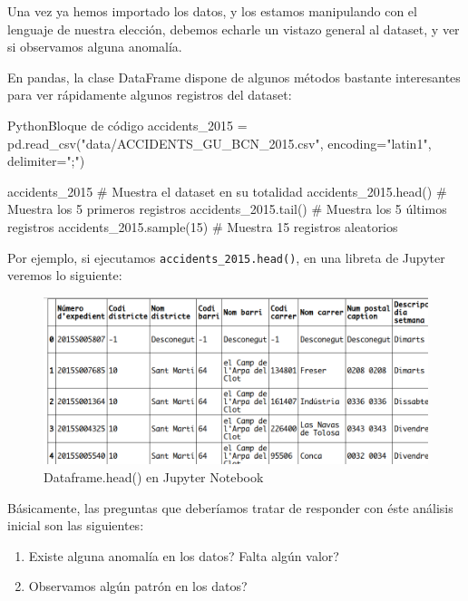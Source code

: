Una vez ya hemos importado los datos, y los estamos manipulando con el lenguaje
de nuestra elección, debemos echarle un vistazo general al dataset, y ver si
observamos alguna anomalía.

En pandas, la clase DataFrame dispone de algunos métodos bastante interesantes
para ver rápidamente algunos registros del dataset: 

\vspace{0.5cm}

\begin{TMcode}{Python}{}{Bloque de código}
accidents_2015 = pd.read_csv("data/ACCIDENTS_GU_BCN_2015.csv", encoding="latin1", delimiter=";")

accidents_2015            # Muestra el dataset en su totalidad
accidents_2015.head()     # Muestra los 5 primeros registros
accidents_2015.tail()     # Muestra los 5 últimos registros
accidents_2015.sample(15) # Muestra 15 registros aleatorios
\end{TMcode}
\vspace{1cm}

Por ejemplo, si ejecutamos \texttt{accidents\_2015.head()}, en una libreta de
Jupyter veremos lo siguiente:

\begin{figure}[ht!]
  \hspace{-0.7cm}
  \includegraphics[scale = 0.45]{img/dataframeHead.png}
  \caption{\label{fig:dataframeHead} Dataframe.head() en Jupyter Notebook}
\end{figure}

Básicamente, las preguntas que deberíamos tratar de responder con éste análisis
inicial son las siguientes:

\begin{enumerate}
\item Existe alguna anomalía en los datos? Falta algún valor?
\item Observamos algún patrón en los datos?
\end{enumerate}


